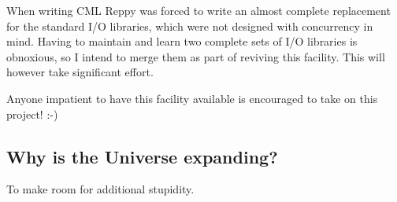 When writing CML Reppy was forced to write an almost complete replacement 
for the standard I/O libraries, which were not designed with concurrency 
in mind.  Having to maintain and learn two complete sets of I/O libraries 
is obnoxious, so I intend to merge them as part of reviving this facility. 
This will however take significant effort.

Anyone impatient to have this facility available is encouraged to take 
on this project! :-)


\subsection{Why is the Universe expanding?}

To make room for additional stupidity.
